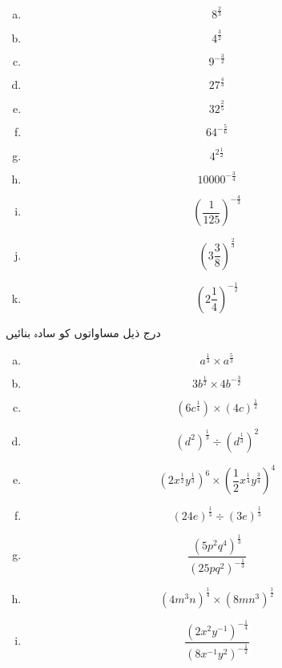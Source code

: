 \begin{multicols}{4}
\begin{enumerate}[a.]
\item
\[8^{\frac{2}{3}}\]
\item
\[4^{\frac{3}{2}}\]
\item
\[9^{-\frac{3}{2}}\]
\item
\[27^{\frac{4}{3}}\]
\item
\[32^{\frac{2}{5}}\]
\item
\[64^{-\frac{5}{6}}\]
\item
\[4^{2\frac{1}{2}}\]
\item
\[\num{10000}^{-\frac{3}{4}}\]
\item
\[(\frac{1}{125})^{-\frac{4}{3}}\]
\item
\[(3\frac{3}{8})^{\frac{2}{3}}\]
\item
\[(2\frac{1}{4})^{-\frac{1}{2}}\]
\end{enumerate}
\end{multicols}

درج ذیل مساواتوں کو سادہ بنائیں
\begin{multicols}{3}
\begin{enumerate}[a.]
\item
\[a^{\frac{1}{3}}\times a^{\frac{5}{3}}\]
\item
\[3b^{\frac{1}{2}}\times 4b^{-\frac{3}{2}}\]
\item
\[(6c^{\frac{1}{4}})\times (4c)^{\frac{1}{2}}\]
\item
\[(d^{2})^{\frac{1}{3}}\div (d^{\frac{1}{3}})^{2}\]
\item
\[(2x^{\frac{1}{2}}y^{\frac{1}{3}})^{6}\times (\frac{1}{2}x^{\frac{1}{4}}y^{\frac{3}{4}})^{4}\]
\item
\[(24e)^{\frac{1}{3}}\div (3e)^{\frac{1}{3}}\]
\item
\[\frac{(5p^{2}q^{4})^{\frac{1}{3}}}{(25pq^{2})^{-\frac{1}{3}}}\]
\item
\[(4m^{3}n)^{\frac{1}{4}}\times (8mn^{3})^{\frac{1}{2}}\]
\item
\[\frac{(2x^{2}y^{-1})^{-\frac{1}{4}}}{(8x^{-1}y^{2})^{-\frac{1}{2}}}\]
\end{enumerate}
\end{multicols}

